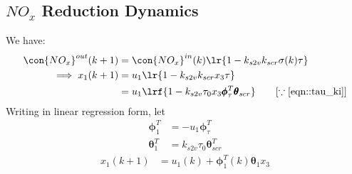 \subsection{$NO_x$ Reduction Dynamics}
We have:
\begin{align*}
    \con{NO_x}^{out} (k + 1) &= \con{NO_x}^{in} (k) \lr{1 - k_{s2v} k_{scr} \sigma(k) \tau}\\
    \implies x_1 (k+1) &= u_1 \lr{1 - k_{s2v} k_{scr} x_3 \tau}\\
                       &= u_1 \lrf{1 - k_{s2v} \tau_0 x_3 \pmb \phi_\tau^T \pmb \theta_{scr}} \qquad [\because \ref{eqn::tau_ki}]
\end{align*}
Writing in linear regression form, let
\begin{align*}
    \pmb \phi_1^T &= -u_1 \pmb \phi_\tau^T  \\
    \pmb \theta_1^T &= k_{s2v} \tau_0 \pmb \theta_{scr}^T
\end{align*}
\begin{align}
    x_1(k+1) &= u_1(k) + \pmb \phi_1^T (k) \pmb \theta_1 x_3  \label{eqn::nox_regression}
\end{align}
